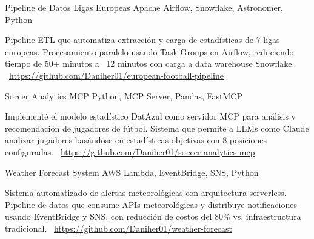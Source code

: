 \documentclass[]{awesome-cv}
\begin{document}
\begin{cventries}
	\vspace{-3mm}
	\cventry
	{}
	{Pipeline de Datos Ligas Europeas \vspace{-5mm}}
	{Apache Airflow, Snowflake, Astronomer, Python \vspace{-5mm}}
	{}
	{\begin{cvsectionnormaltext}
		\item {Pipeline ETL que automatiza extracción y carga de estadísticas de 7 ligas europeas. Procesamiento paralelo usando Task Groups en Airflow, reduciendo tiempo de 50+ minutos a ~12 minutos con carga a data warehouse Snowflake.
		\newline \faLink\ \href{https://github.com/Daniher01/european-football-pipeline}{https://github.com/Daniher01/european-football-pipeline}}
	\end{cvsectionnormaltext}}

	\vspace{-3mm}
	\cventry
	{}
	{Soccer Analytics MCP \vspace{-5mm}}
	{Python, MCP Server, Pandas, FastMCP \vspace{-5mm}}
	{}
	{\begin{cvsectionnormaltext}
		\item {Implementé el modelo estadístico DatAzul como servidor MCP para análisis y recomendación de jugadores de fútbol. Sistema que permite a LLMs como Claude analizar jugadores basándose en estadísticas objetivas con 8 posiciones configuradas.
		\newline \faLink\ \href{https://github.com/Daniher01/soccer-analytics-mcp}{https://github.com/Daniher01/soccer-analytics-mcp}}
	\end{cvsectionnormaltext}}

	\vspace{-3mm}
	\cventry
	{}
	{Weather Forecast System \vspace{-5mm}}
	{AWS Lambda, EventBridge, SNS, Python \vspace{-5mm}}
	{}
	{\begin{cvsectionnormaltext}
		\item {Sistema automatizado de alertas meteorológicas con arquitectura serverless. Pipeline de datos que consume APIs meteorológicas y distribuye notificaciones usando EventBridge y SNS, con reducción de costos del 80\% vs. infraestructura tradicional.
		\newline \faLink\ \href{https://github.com/Daniher01/weather-forecast}{https://github.com/Daniher01/weather-forecast}}
	\end{cvsectionnormaltext}}


\end{cventries}
\end{document}
